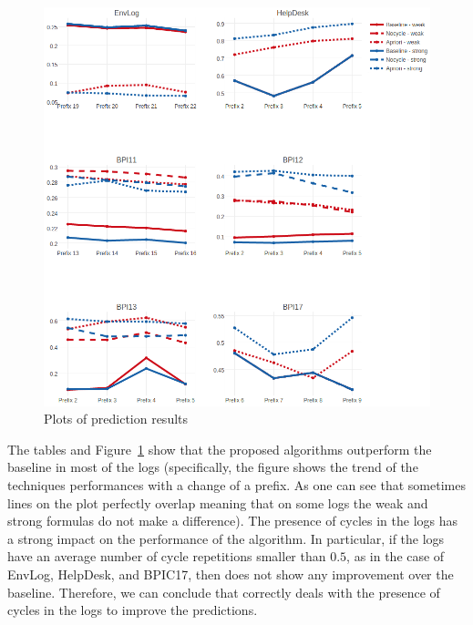 \begin{figure}[!ht]
	\begin{center}  
		\includegraphics[width=\textwidth]{2_evaluation.png}
		\caption{Plots of prediction results}
		\label{figure:results}
	\end{center}
\end{figure}


The tables and Figure~\ref{figure:results} show that the proposed algorithms outperform the baseline in most of the logs (specifically, the figure shows the trend of the techniques performances with a change of a prefix. As one can see that sometimes lines on the plot perfectly overlap meaning that on some logs the weak and strong formulas do not make a difference). The presence of cycles in the logs has a strong impact on the performance of the \nocycle algorithm. In particular, if the logs have an average number of cycle repetitions smaller than $0.5$, as in the case of EnvLog, HelpDesk, and BPIC17, then \nocycle does not show any improvement over the baseline. Therefore, we can conclude that \nocycle correctly deals with the presence of cycles in the logs to improve the predictions.





